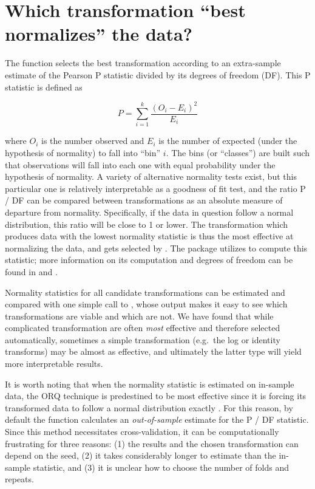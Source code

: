 \hypertarget{which-transformation-best-normalizes-the-data}{%
\section{Which transformation ``best normalizes'' the
data?}\label{which-transformation-best-normalizes-the-data}}

The  function selects the best transformation
according to an extra-sample estimate of the Pearson P statistic divided
by its degrees of freedom (DF). This P statistic is defined as

\[
P = \sum_{i=1}^{k} \frac{(O_i - E_i)^2}{E_i}
\]

\noindent where \(O_i\) is the number observed and \(E_i\) is the number
of expected (under the hypothesis of normality) to fall into ``bin''
\(i\). The bins (or ``classes'') are built such that observations will
fall into each one with equal probability under the hypothesis of
normality. A variety of alternative normality tests exist, but this
particular one is relatively interpretable as a goodness of fit test,
and the ratio P / DF can be compared between transformations as an
absolute measure of departure from normality. Specifically, if the data
in question follow a normal distribution, this ratio will be close to 1
or lower. The transformation which produces data with the lowest
normality statistic is thus the most effective at normalizing the data,
and gets selected by . The 
package utilizes  \citep{nortest} to compute this
statistic; more information on its computation and degrees of freedom
can be found in \citet{d1986goodness} and \citet{thode2002testing}.

Normality statistics for all candidate transformations can be estimated
and compared with one simple call to , whose output
makes it easy to see which transformations are viable and which are not.
We have found that while complicated transformation are often
\emph{most} effective and therefore selected automatically, sometimes a
simple transformation (e.g.~the log or identity transforms) may be
almost as effective, and ultimately the latter type will yield more
interpretable results.

It is worth noting that when the normality statistic is estimated on
in-sample data, the ORQ technique is predestined to be most effective
since it is forcing its transformed data to follow a normal distribution
exactly \citep{orq_paper}. For this reason, by default the
 function calculates an \emph{out-of-sample}
estimate for the P / DF statistic. Since this method necessitates
cross-validation, it can be computationally frustrating for three
reasons: (1) the results and the chosen transformation can depend on the
seed, (2) it takes considerably longer to estimate than the in-sample
statistic, and (3) it is unclear how to choose the number of folds and
repeats.

